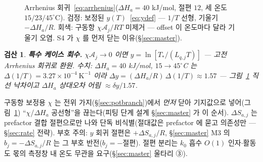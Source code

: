 \documentclass[11pt,a4paper]{article}
\newtheorem*{verifybox}{검산}
\begin{document}
\begin{figure}[t]
\centering
{}
\caption{Arrhenius 회귀~\eqref{eq:arrhenius}($\Delta H_a=40$ kJ/mol, 절편 $12$, 세 온도 $15/23/45^\circ$C). 검정: 보정된 $y(T)$~\eqref{eq:ydef} — $1/T$ 선형, 기울기 $-\Delta H_a/R$. 회색: 구동항 $\chi\mathcal A_j/RT$ 미제거 — offset 이 온도마다 달라 기울기 오염. S4 가 $\chi$ 를 먼저 닫는 이유(\S\ref{sec:master}).}
\label{fig:arrplot}
\end{figure}

\begin{verifybox}
\textbf{특수 케이스 회수.} $\chi\mathcal A_j\to0$ 이면 $y=\ln[T_*/(L_{q,j}T)]$ — 고전 Arrhenius 회귀로 환원. 수치: $\Delta H_a=40$ kJ/mol, $15\to45^\circ$C 는 $\Delta(1/T)=3.27\times10^{-4}\ \mathrm{K^{-1}}$ 이라 $\Delta y=(\Delta H_a/R)\,\Delta(1/T)\approx1.57$ — 그림~\ref{fig:arrplot} 직선 낙차이고 $\Delta H_a$ 상대오차 어림 $\approx\delta y/1.57$.
\end{verifybox}

구동항 보정용 $\chi$ 는 전위 가지(\S\ref{sec:potbranch})에서 \emph{먼저} 닫아 기지값으로 넣어(그림~\ref{fig:arrplot}) ``$\chi$/$\Delta H_a$ 공선형''을 끊는다(피팅 단계 설계 \S\ref{sec:master} 가 이 순서). $\Delta S_{a,j}$ 는 prefactor 결합 절편으로만 나와 단독 비식별(절대값은 prefactor 에 묻고 의존성만 — \S\ref{sec:rate} 전략). 부호 주의: $y$ 회귀 절편은 $+\Delta S_{a,j}/R$, \S\ref{sec:master} M3 의 $b_j=-\Delta S_{a,j}/R$ 는 그 부호 반전($b_j=-$절편). 절편 분리는 $k_0$ 흡수 $O(1)$ 인자$\cdot$활동도 몫의 측정창 내 온도 무관을 요구(\S\ref{sec:master} 울타리 ③).
\end{document}
